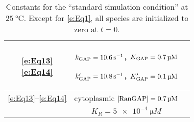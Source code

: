 \documentclass[12pt,notitlepage]{article}
\begin{document}
\begin{table}
\begin{tabular}{c|c|c}
	\makecell{
		\eqref{e:Eq13} \\ \eqref{e:Eq14}
	}
	&
	\makecell{
		$k_{\ce{GAP}} = \SI{10.6}{s^{-1}}$,
		\quad
		$K_{\ce{GAP}} = \SI{0.7}{\micro M}$
		\\
		$k_{\ce{GAP}}' = \SI{10.8}{s^{-1}}$,
		\quad
		$K_{\ce{GAP}}' = \SI{0.1}{\micro M}$
	}
	&
	\makecell{
		\cite[Supp.~Table~A]{GoerlichSeewaldRibbeck2003}
		\\
		\cite[Table~I]{GoerlichSeewaldRibbeck2003}
	}
	\\
	\hline
	\eqref{e:Eq13}--\eqref{e:Eq14}
	&
	cytoplasmic
	$[\ce{RanGAP}] = \SI{0.7}{\micro M}$
	&
	\cite[Table~II / ST~B]{GoerlichSeewaldRibbeck2003}
	\\
	\hline
	\TODO{Eq}
	&
	$K_R = \SI{5e-4}{\micro M}$
	&
	\cite[Supp.~Table~A]{GoerlichSeewaldRibbeck2003}
	\\
	\hline
\end{tabular}
%
\caption{%
	Constants
	for the ``standard simulation condition''
	at $\SI{25}{\celsius}$.
	Except for \eqref{e:Eq1},
	all species are initialized to zero at $t = 0$.
}
%
\label{t:GSR-const}
\end{table}
\end{document}
